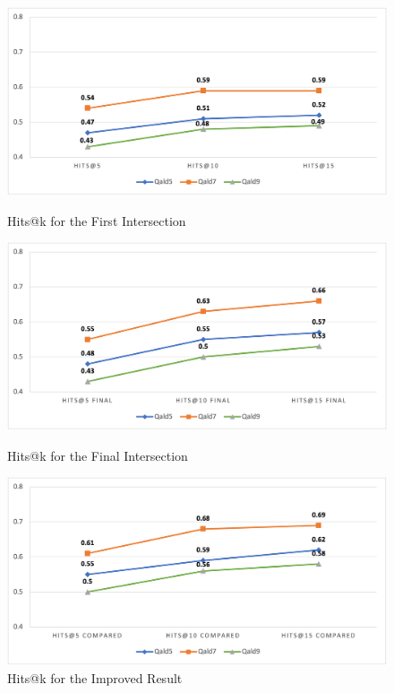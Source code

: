 \begin{figure}[p]
    \centering
    \begin{minipage}{0.7\textwidth}
   \includegraphics[width=\textwidth]{chapters/figures/firstHits.png}
    \caption{Hits@k for the First Intersection}
    \label{fig:firstHits}
     \end{minipage}
         \begin{minipage}{0.7\textwidth}
   \includegraphics[width=\textwidth]{chapters/figures/finalHits.png}
    \caption{Hits@k for the Final Intersection}
    \label{fig:finalHits}
     \end{minipage}
         \begin{minipage}{0.7\textwidth}
    \includegraphics[width=\textwidth]{chapters/figures/ComparedHits.png}
        \caption{Hits@k for the Improved Result}
        \label{fig:ComparedHits}
    \end{minipage}
\end{figure}

